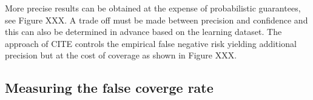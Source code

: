 More precise results can be obtained at the expense of probabilistic guarantees, see Figure XXX. A trade off must be made between precision and confidence and this can also be determined in advance based on the learning dataset. The approach of CITE controls the empirical false negative risk yielding additional precision but at the cost of coverage as shown in Figure XXX. 

\subsection{Measuring the false coverge rate}



